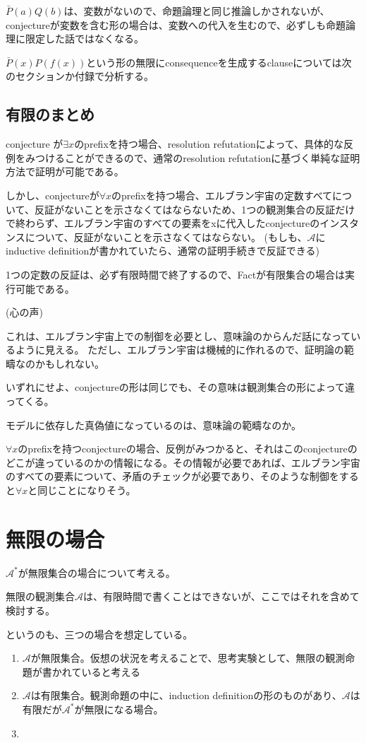\documentclass[10pt, oneside]{jarticle}   	%
\theoremstyle{definition}
\newcommand{\clos}[1]{\mathcal{#1}^{*}}
\begin{document}
$\bar P(a) Q(b)$は、変数がないので、命題論理と同じ推論しかされないが、conjectureが変数を含む形の場合は、変数への代入を生むので、必ずしも命題論理に限定した話ではなくなる。

$\bar P(x) P(f(x))$という形の無限にconsequenceを生成するclauseについては次のセクションか付録で分析する。


\subsection{有限のまとめ}
conjecture が$\exists x $のprefixを持つ場合、resolution refutationによって、具体的な反例をみつけることができるので、通常のresolution refutationに基づく単純な証明方法で証明が可能である。

しかし、conjectureが$\forall x$のprefixを持つ場合、エルブラン宇宙の定数すべてについて、反証がないことを示さなくてはならないため、1つの観測集合の反証だけで終わらず、エルブラン宇宙のすべての要素をxに代入したconjectureのインスタンスについて、反証がないことを示さなくてはならない。
(もしも、$\mathcal{A}$にinductive definitionが書かれていたら、通常の証明手続きで反証できる)

1つの定数の反証は、必ず有限時間で終了するので、Factが有限集合の場合は実行可能である。

(心の声)

これは、エルブラン宇宙上での制御を必要とし、意味論のからんだ話になっているように見える。
ただし、エルブラン宇宙は機械的に作れるので、証明論の範疇なのかもしれない。

いずれにせよ、conjectureの形は同じでも、その意味は観測集合の形によって違ってくる。

モデルに依存した真偽値になっているのは、意味論の範疇なのか。

$\forall x$のprefixを持つconjectureの場合、反例がみつかると、それはこのconjectureのどこが違っているのかの情報になる。その情報が必要であれば、エルブラン宇宙のすべての要素について、矛盾のチェックが必要であり、そのような制御をすると$\forall x$と同じことになりそう。


\section{無限の場合}

$\clos{A}$が無限集合の場合について考える。

無限の観測集合$\mathcal{A}$は、有限時間で書くことはできないが、ここではそれを含めて検討する。

というのも、三つの場合を想定している。
\begin{enumerate}
\item $\mathcal{A}$が無限集合。仮想の状況を考えることで、思考実験として、無限の観測命題が書かれていると考える
\item $\mathcal{A}$は有限集合。観測命題の中に、induction definitionの形のものがあり、$\mathcal{A}$は有限だが$\clos{A}$が無限になる場合。
\item 
\end{enumerate}
\end{document}

